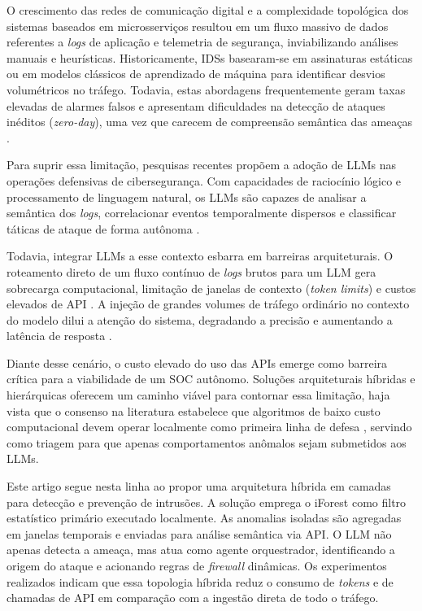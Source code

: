 \documentclass[sigconf, anonymous]{acmart}
\begin{document}
O crescimento das redes de comunicação digital e a complexidade topológica dos sistemas baseados em microsserviços resultou em um fluxo massivo de dados referentes a \textit{logs} de aplicação e telemetria de segurança, inviabilizando análises manuais e heurísticas. Historicamente, \acp{IDS} basearam-se em assinaturas estáticas ou em modelos clássicos de aprendizado de máquina para identificar desvios volumétricos no tráfego. Todavia, estas abordagens frequentemente geram taxas elevadas de alarmes falsos e apresentam dificuldades na detecção de ataques inéditos (\textit{zero-day}), uma vez que carecem de compreensão semântica das ameaças \cite{ahmad2021network}.

Para suprir essa limitação, pesquisas recentes propõem a adoção de \acp{LLM} nas operações defensivas de cibersegurança. Com capacidades de raciocínio lógico e processamento de linguagem natural, os \acp{LLM} são capazes de analisar a semântica dos \textit{logs}, correlacionar eventos temporalmente dispersos e classificar táticas de ataque de forma autônoma \cite{qiang2023loggpt, ferrag2023revolutionizing}.

Todavia, integrar \acp{LLM} a esse contexto esbarra em barreiras arquiteturais. O roteamento direto de um fluxo contínuo de \textit{logs} brutos para um \ac{LLM} gera sobrecarga computacional, limitação de janelas de contexto (\textit{token limits}) e custos elevados de \ac{API} \cite{qiang2023loggpt}. A injeção de grandes volumes de tráfego ordinário no contexto do modelo dilui a atenção do sistema, degradando a precisão e aumentando a latência de resposta \cite{yao2024llmsecurity, wu2023privacy}.

Diante desse cenário, o custo elevado do uso das APIs emerge como barreira crítica para a viabilidade de um SOC autônomo. Soluções arquiteturais híbridas e hierárquicas oferecem um caminho viável para contornar essa limitação, haja vista que o consenso na literatura estabelece que algoritmos de baixo custo computacional devem operar localmente como primeira linha de defesa \cite{ferrag2023revolutionizing}, servindo como triagem para que apenas comportamentos anômalos sejam submetidos aos \acp{LLM}.

Este artigo segue nesta linha ao propor uma arquitetura híbrida em camadas para detecção e prevenção de intrusões. A solução emprega o \ac{iForest} como filtro estatístico primário executado localmente. As anomalias isoladas são agregadas em janelas temporais e enviadas para análise semântica via \ac{API}. O \ac{LLM} não apenas detecta a ameaça, mas atua como agente orquestrador, identificando a origem do ataque e acionando regras de \textit{firewall} dinâmicas. Os experimentos realizados indicam que essa topologia híbrida reduz o consumo de \textit{tokens} e de chamadas de \ac{API} em comparação com a ingestão direta de todo o tráfego.
\end{document}

